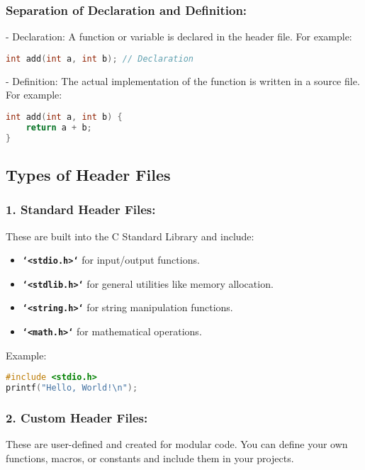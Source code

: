 \subsubsection{Separation of Declaration and Definition:}  
- Declaration: A function or variable is declared in the header file. For example:

\begin{lstlisting}[caption=Example C++, label={lst:listing-cpp}, language=C++, style=myStyle]
	int add(int a, int b); // Declaration
\end{lstlisting}
- Definition: The actual implementation of the function is written in a source file. For example:
\begin{lstlisting}[caption=Example C++, label={lst:listing-cpp}, language=C++, style=myStyle]
int add(int a, int b) {
	return a + b;
}
\end{lstlisting}


\subsection{ Types of Header Files}
\subsubsection{1. Standard Header Files:  }
These are built into the C Standard Library and include:
\begin{itemize}
	\item\textbf{\texttt{`<stdio.h>`}} for input/output functions.
	\item\textbf{\texttt{`<stdlib.h>`}} for general utilities like memory allocation.
	\item\textbf{\texttt{`<string.h>`}} for string manipulation functions.
	\item\textbf{\texttt{`<math.h>`}} for mathematical operations.
\end{itemize}

Example:
\begin{lstlisting}[caption=Example C++, label={lst:listing-cpp}, language=C++, style=myStyle]
#include <stdio.h>
printf("Hello, World!\n");
\end{lstlisting}

\subsubsection{2. Custom Header Files: } 
These are user-defined and created for modular code. You can define your own functions, macros, or constants and include them in your projects.


